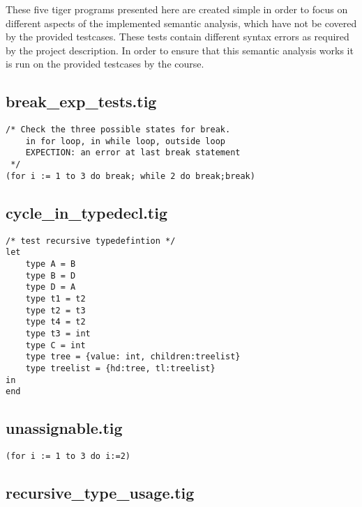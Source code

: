 \documentclass{article}
\begin{document}
These five tiger programs presented here are created simple in order to focus on different aspects of the implemented semantic analysis, which have not be covered by the provided testcases. These tests contain different syntax errors as required by the project description. In order to ensure that this semantic analysis works it is run on the provided testcases by the course. 



\subsection{break\_exp\_tests.tig}

\begin{lstlisting}[frame=single]
/* Check the three possible states for break.
	in for loop, in while loop, outside loop
	EXPECTION: an error at last break statement
 */
(for i := 1 to 3 do break; while 2 do break;break)
\end{lstlisting}

\subsection{cycle\_in\_typedecl.tig}

\begin{lstlisting}[frame=single]
/* test recursive typedefintion */
let
	type A = B
	type B = D
	type D = A
	type t1 = t2
	type t2 = t3
	type t4 = t2
	type t3 = int
	type C = int
	type tree = {value: int, children:treelist}
	type treelist = {hd:tree, tl:treelist}
in 
end
\end{lstlisting}

\subsection{unassignable.tig}

\begin{lstlisting}[frame=single]
(for i := 1 to 3 do i:=2)
\end{lstlisting}

\subsection{recursive\_type\_usage.tig}
\end{document}
